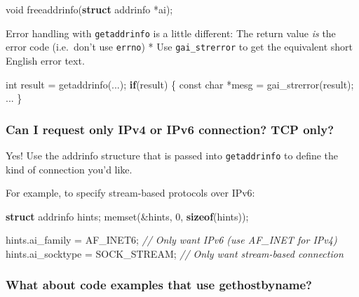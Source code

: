 \documentclass[]{article}
\newenvironment{Shaded}{}{}
\newcommand{\KeywordTok}[1]{\textcolor[rgb]{0.00,0.44,0.13}{\textbf{{#1}}}}
\newcommand{\DataTypeTok}[1]{\textcolor[rgb]{0.56,0.13,0.00}{{#1}}}
\newcommand{\DecValTok}[1]{\textcolor[rgb]{0.25,0.63,0.44}{{#1}}}
\newcommand{\CommentTok}[1]{\textcolor[rgb]{0.38,0.63,0.69}{\textit{{#1}}}}
\newcommand{\NormalTok}[1]{{#1}}
\begin{document}
\begin{Shaded}
\begin{Highlighting}[]
\DataTypeTok{void} \NormalTok{freeaddrinfo(}\KeywordTok{struct} \NormalTok{addrinfo *ai);}
\end{Highlighting}
\end{Shaded}

Error handling with \texttt{getaddrinfo} is a little different: The
return value \emph{is} the error code (i.e.~don't use \texttt{errno}) *
Use \texttt{gai\_strerror} to get the equivalent short English error
text.

\begin{Shaded}
\begin{Highlighting}[]
\DataTypeTok{int} \NormalTok{result = getaddrinfo(...);}
\KeywordTok{if}\NormalTok{(result) \{ }
   \DataTypeTok{const} \DataTypeTok{char} \NormalTok{*mesg = gai_strerror(result); }
   \NormalTok{...}
\NormalTok{\}}
\end{Highlighting}
\end{Shaded}

\subsubsection{Can I request only IPv4 or IPv6 connection? TCP
only?}\label{can-i-request-only-ipv4-or-ipv6-connection-tcp-only}

Yes! Use the addrinfo structure that is passed into \texttt{getaddrinfo}
to define the kind of connection you'd like.

For example, to specify stream-based protocols over IPv6:

\begin{Shaded}
\begin{Highlighting}[]
\KeywordTok{struct} \NormalTok{addrinfo hints;}
\NormalTok{memset(&hints, }\DecValTok{0}\NormalTok{, }\KeywordTok{sizeof}\NormalTok{(hints));}

\NormalTok{hints.ai_family = AF_INET6; }\CommentTok{// Only want IPv6 (use AF_INET for IPv4)}
\NormalTok{hints.ai_socktype = SOCK_STREAM; }\CommentTok{// Only want stream-based connection}
\end{Highlighting}
\end{Shaded}

\subsubsection{What about code examples that use
gethostbyname?}\label{what-about-code-examples-that-use-gethostbyname}
\end{document}
